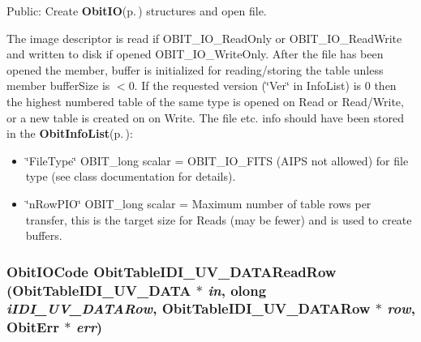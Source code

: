 Public: Create {\bf Obit\-IO}{\rm (p.\,\pageref{structObitIO})} structures and open file. 

The image descriptor is read if OBIT\_\-IO\_\-Read\-Only or OBIT\_\-IO\_\-Read\-Write and written to disk if opened OBIT\_\-IO\_\-Write\-Only. After the file has been opened the member, buffer is initialized for reading/storing the table unless member buffer\-Size is $<$0. If the requested version (\char`\"{}Ver\char`\"{} in Info\-List) is 0 then the highest numbered table of the same type is opened on Read or Read/Write, or a new table is created on on Write. The file etc. info should have been stored in the {\bf Obit\-Info\-List}{\rm (p.\,\pageref{structObitInfoList})}: \begin{itemize}
\item \char`\"{}File\-Type\char`\"{} OBIT\_\-long scalar = OBIT\_\-IO\_\-FITS (AIPS not allowed) for file type (see class documentation for details). \item \char`\"{}n\-Row\-PIO\char`\"{} OBIT\_\-long scalar = Maximum number of table rows per transfer, this is the target size for Reads (may be fewer) and is used to create buffers. 
\end{itemize}
\subsubsection{\setlength{\rightskip}{0pt plus 5cm}Obit\-IOCode Obit\-Table\-IDI\_\-UV\_\-DATARead\-Row ({\bf Obit\-Table\-IDI\_\-UV\_\-DATA} $\ast$ {\em in}, {\bf olong} {\em i\-IDI\_\-UV\_\-DATARow}, {\bf Obit\-Table\-IDI\_\-UV\_\-DATARow} $\ast$ {\em row}, {\bf Obit\-Err} $\ast$ {\em err})}\label{ObitTableIDI__UV__DATA_8h_a18}


